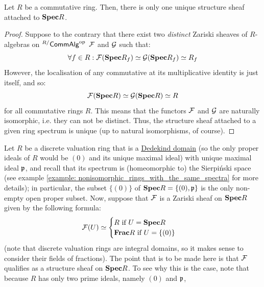                 \begin{proposition} \label{prop: structure_sheaf_uniqueness}
                    Let $R$ be a commutative ring. Then, there is only one unique structure sheaf attached to $\mathbf{Spec} R$. 
                \end{proposition}
                    \begin{proof}
                        Suppose to the contrary that there exist two \textit{distinct} Zariski sheaves of $R$-algebras on ${}^{R/}\mathsf{Comm}\mathsf{Alg}^{\mathrm{op}}$ $\mathcal{F}$ and $\mathcal{G}$ such that:
                            $$\forall f \in R: \mathcal{F}(\mathbf{Spec} R_f) \simeq \mathcal{G}(\mathbf{Spec} R_f) \simeq R_f$$
                        However, the localisation of any commutative at its multiplicative identity is just itself, and so:
                            $$\mathcal{F}(\mathbf{Spec} R) \simeq \mathcal{G}(\mathbf{Spec} R) \simeq R$$
                        for all commutative rings $R$. This means that the functors $\mathcal{F}$ and $\mathcal{G}$ are naturally isomorphic, i.e. they can not be distinct. Thus, the structure sheaf attached to a given ring spectrum is unique (up to natural isomorphisms, of course).
                    \end{proof}
                    
                \begin{example}
                    Let $R$ be a discrete valuation ring that is a \href{https://en.wikipedia.org/wiki/Dedekind_domain}{\underline{Dedekind domain}} (so the only proper ideals of $R$ would be $(0)$ and its unique maximal ideal) with unique maximal ideal $\mathfrak{p}$, and recall that its spectrum is (homeomorphic to) the Sierpi\'nski space (see example \ref{example: nonisomorphic_rings_with_the_same_spectra} for more details); in particular, the subset $\{(0)\}$ of $\mathbf{Spec} R = \{(0), \mathfrak{p}\}$ is the only non-empty open proper subset. Now, suppose that $\mathcal{F}$ is a Zariski sheaf on $\mathbf{Spec} R$ given by the following formula:
                        $$
                            \mathcal{F}(U) \simeq 
                            \begin{cases}
                                \text{$R$ if $U = \mathbf{Spec} R$}
                                \\
                                \text{$\mathbf{Frac} R$ if $U = \{(0)\}$}
                            \end{cases}
                        $$
                    (note that discrete valuation rings are integral domains, so it makes sense to consider their fields of fractions). The point that is to be made here is that $\mathcal{F}$ qualifies as a structure sheaf on $\mathbf{Spec} R$. To see why this is the case, note that because $R$ has only two prime ideals, namely $(0)$ and $\mathfrak{p}$, 
                \end{example}
                
